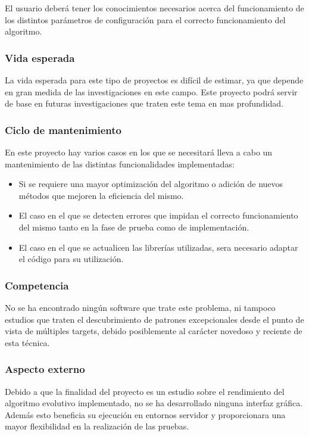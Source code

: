 \documentclass[a4paper,12pt,twoside,final]{book}
\begin{document}
El usuario deberá tener los conocimientos necesarios acerca del funcionamiento de los distintos parámetros de configuración para el correcto funcionamiento del algoritmo.


\subsubsection{Vida esperada}

La vida esperada para este tipo de proyectos es difícil de estimar, ya que depende en gran medida de las investigaciones en este campo. Este proyecto podrá servir de base en futuras investigaciones que traten este tema en mas profundidad.\\

\subsubsection{Ciclo de mantenimiento}

En este proyecto hay varios casos en los que se necesitará lleva a cabo un mantenimiento de las distintas funcionalidades implementadas:
\begin{itemize}
\item Si se requiere una mayor optimización del algoritmo o adición de nuevos métodos que mejoren la eficiencia del mismo.

\item El caso en el que se detecten errores que impidan el correcto funcionamiento del mismo tanto en la fase de prueba como de implementación.

\item El caso en el que se actualicen las librerías utilizadas, sera necesario adaptar el código para su utilización.
\end{itemize}

\subsubsection{Competencia}
No se ha encontrado ningún software que trate este problema, ni tampoco estudios que traten el descubrimiento de patrones excepcionales desde el punto de vista de múltiples targets, debido posiblemente al carácter novedoso y reciente de esta técnica.

\subsubsection{Aspecto externo}
Debido a que la finalidad del proyecto es un estudio sobre el rendimiento del algoritmo evolutivo implementado, no se ha desarrollado ninguna interfaz gráfica. Además esto beneficia su ejecución en entornos servidor y proporcionara una mayor flexibilidad en la realización de las pruebas.
\end{document}
